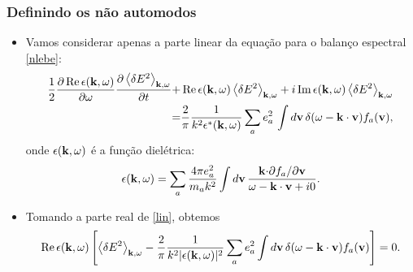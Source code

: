 \documentclass[10pt,aspectratio=1610,lualatex]{beamer}
\begin{document}

\begin{frame}
  \frametitle{Definindo os não automodos}
  \begin{itemize}
    \item Vamos considerar apenas a parte linear da equação
    para o balanço espectral \eqref{nlebe}:
    \begin{equation}
      \label{lin}
      \begin{split}
	\frac{1}{2}\frac{\partial\,\mbox{Re}\,
	  \epsilon({\bf k},\omega)}{\partial \omega}
	\frac{\partial \left<\delta E^2\right>_{{\bf k},\omega}}{\partial t}
	+&\,\mbox{Re}\,\epsilon({\bf k},\omega)
	\left< \delta E^2 \right>_{{\bf k},\omega}
	+i\,\mbox{Im}\,\epsilon({\bf k},\omega)
	\left< \delta E^2 \right>_{{\bf k},\omega}\\
	=&\frac{2}{\pi}\frac{1}{k^2\epsilon^{*}({\bf k},\omega)}
	\sum_a e^2_a\, \int d{\bf v}\,
	\delta(\omega-{\bf k \cdot v})f_a({\bf v}),
      \end{split}
    \end{equation}
    onde $\epsilon({\bf k},\omega)$ é a função dielétrica:
    \begin{equation}
      \label{dielec}
      \epsilon({\bf k},\omega)=\sum_a \frac{4\pi e^2_a}{m_ak^2}\int d{\bf v}\,
      \frac{{\bf k \cdot}\partial f_a/\partial{\bf v}}{\omega-{\bf k \cdot v}+i0}.
    \end{equation}
    \pause
    \item Tomando a parte real de \eqref{lin}, obtemos
    \begin{equation}
      \label{real}
      \mbox{Re}\, \epsilon({\bf k},\omega)\left[
      \left\langle \delta E^2 \right\rangle_{{\bf k},\omega}
      -\frac{2}{\pi}\frac{1}{k^2|\epsilon({\bf k},\omega)|^2}
      \sum_a e_a^2 \int d{\bf v}\, \delta(\omega-{\bf k \cdot v})
      f_a({\bf v})\right]=0.
    \end{equation}
  \end{itemize}
\end{frame}
\end{document}

